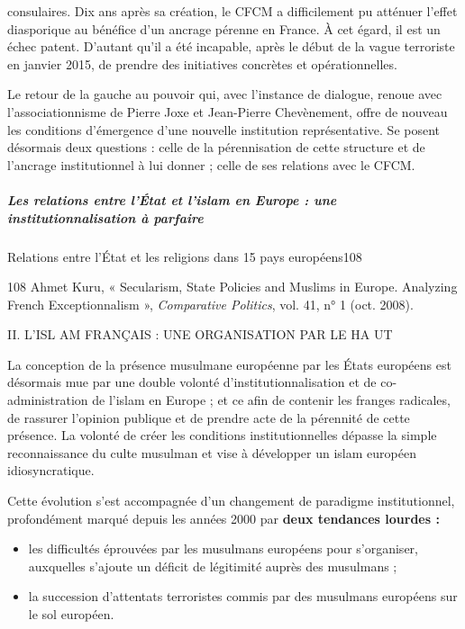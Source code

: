 consulaires. Dix ans après sa création, le CFCM a difficilement pu
atténuer l'effet diasporique au bénéfice d'un ancrage pérenne en France.
À cet égard, il est un échec patent. D'autant qu'il a été incapable,
après le début de la vague terroriste en janvier 2015, de prendre des
initiatives concrètes et opérationnelles.

Le retour de la gauche au pouvoir qui, avec l'instance de dialogue,
renoue avec l'associationnisme de Pierre Joxe et Jean-Pierre
Chevènement, offre de nouveau les conditions d'émergence d'une nouvelle
institution représentative. Se posent désormais deux questions : celle
de la pérennisation de cette structure et de l'ancrage institutionnel à
lui donner ; celle de ses relations avec le CFCM.


\hypertarget{les-relations-entre-luxe9tat-et-lislam-en-europe-une-institutionnalisation-uxe0-parfaire}{%
\subparagraph{Les relations entre l'État et l'islam en Europe : une
institutionnalisation à
parfaire}\label{les-relations-entre-luxe9tat-et-lislam-en-europe-une-institutionnalisation-uxe0-parfaire}}

Relations entre l'État et les religions dans 15 pays européens108


108 Ahmet Kuru, « Secularism, State Policies and Muslims in Europe.
Analyzing French Exceptionnalism », \emph{Comparative Politics}, vol.
41, n° 1 (oct. 2008).

II. L'ISL AM FRANÇAIS : UNE ORGANISATION PAR LE HA UT

La conception de la présence musulmane européenne par les États
européens est désormais mue par une double volonté
d'institutionnalisation et de co-administration de l'islam en Europe ;
et ce afin de contenir les franges radicales, de rassurer l'opinion
publique et de prendre acte de la pérennité de cette présence. La
volonté de créer les conditions institutionnelles dépasse la simple
reconnaissance du culte musulman et vise à développer un islam européen
idiosyncratique.

Cette évolution s'est accompagnée d'un changement de paradigme
institutionnel, profondément marqué depuis les années 2000 par
\textbf{deux tendances lourdes :}


\begin{itemize}
\item
  les difficultés éprouvées par les musulmans européens pour
  s'organiser, auxquelles s'ajoute un déficit de légitimité auprès des
  musulmans ;
\item
  la succession d'attentats terroristes commis par des musulmans
  européens sur le sol européen.
\end{itemize}

